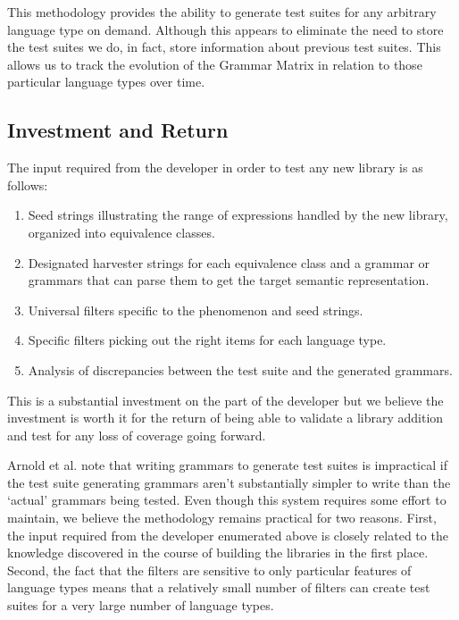 \documentclass[11pt]{article}
\begin{document}
This methodology provides the ability to generate test suites for any
arbitrary language type on demand.  Although this appears to eliminate
the need to store the test suites we do, in fact, store information
about previous test suites. This allows us to track the evolution of
the Grammar Matrix in relation to those particular language types over
time.

\subsection{Investment and Return}

The input required from the developer in order to
test any new library is as follows:

\begin{enumerate}
\item Seed strings illustrating the range of expressions
handled by the new library, organized into equivalence
classes.
\item Designated harvester strings for each equivalence class
and a grammar or grammars that can parse them to get
the target semantic representation.
\item Universal filters specific to the phenomenon and
seed strings.
\item Specific filters picking out the right items for
each language type.
\item Analysis of discrepancies between the test suite
and the generated grammars.
\end{enumerate}
%
This is a substantial investment on the part of the developer 
but we believe the investment is worth it for the return of being 
able to validate a library addition and test for any loss of coverage 
going forward.

Arnold et al.  note that writing grammars to
generate test suites is impractical if the test suite generating
grammars aren't substantially simpler to write than the `actual'
grammars being tested.  Even though this system requires some effort
to maintain, we believe the methodology remains practical for two reasons. 
First, the input required from the developer enumerated above is
closely related to the knowledge discovered in the course of building
the libraries in the first place.  Second, the fact that the filters
are sensitive to only particular features of language types means that
a relatively small number of filters can create test suites for a very
large number of language types.
\end{document}
